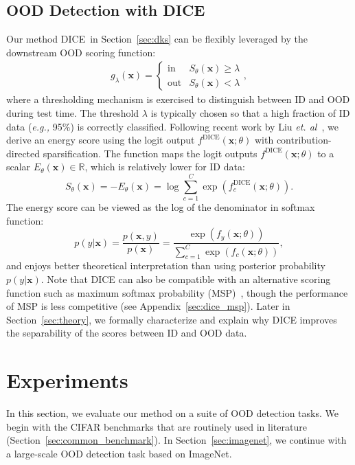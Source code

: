 \documentclass[runningheads]{llncs}
\newcommand{\methodAbbr}{DICE~}
\def\*#1{\mathbf{#1}}
\begin{document}
\subsection{OOD Detection with DICE}
Our method \methodAbbr  in Section~\ref{sec:dks} can be flexibly leveraged by the downstream OOD scoring function:
\begin{align}
\label{eq:threshold_dice}
	g_{\lambda}(\*x)=\begin{cases} 
      \text{in} & S_\theta(\*x)\ge \lambda \\
      \text{out} & S_\theta(\*x) < \lambda
   \end{cases},
\end{align}
 where a thresholding mechanism is exercised to distinguish between ID and OOD during test time. The threshold $\lambda$ is typically chosen so that a high fraction of ID data (\emph{e.g.,} 95\%) is correctly classified. Following recent work by Liu \emph{et. al}~\cite{liu2020energy}, we derive an energy score using the logit output $f^\text{DICE}(\*x;\theta)$ with contribution-directed sparsification. The function maps the logit outputs $f^\text{DICE}(\*x;\theta)$ to a scalar $E_\theta(\*x) \in \mathbb{R}$, which is relatively lower for ID data:
 \begin{equation}
     S_\theta(\*x) = -E_\theta(\*x) = \log \sum_{c=1}^C \exp(f_c^\text{DICE}(\*x;\theta)).
 \end{equation}
 The energy score can be viewed as the log of the denominator in softmax function:
 \begin{equation}
     p(y | \*x) = \frac{p(\*x,y)}{p(\*x)} = \frac{\exp(f_y(\*x;\theta))}{\sum_{c=1}^C \exp(f_c(\*x;\theta))},
 \end{equation}
and enjoys better theoretical interpretation than using posterior probability $p(y|\*x)$. 
Note that DICE can also be compatible with an alternative scoring function such as maximum softmax probability (MSP)~\cite{Kevin}, though the performance of MSP is less competitive (see Appendix~\ref{sec:dice_msp}). Later in Section~\ref{sec:theory}, we formally characterize and explain why DICE improves the separability of the  scores between ID and OOD data. 
\label{sec:ood}




\section{Experiments}
\label{sec:experiments}
In this section, we evaluate our method on a suite of OOD detection tasks. We begin with the CIFAR benchmarks that are routinely used in literature (Section~\ref{sec:common_benchmark}).  In Section~\ref{sec:imagenet}, we continue with a large-scale OOD detection task based on ImageNet. 
\end{document}
